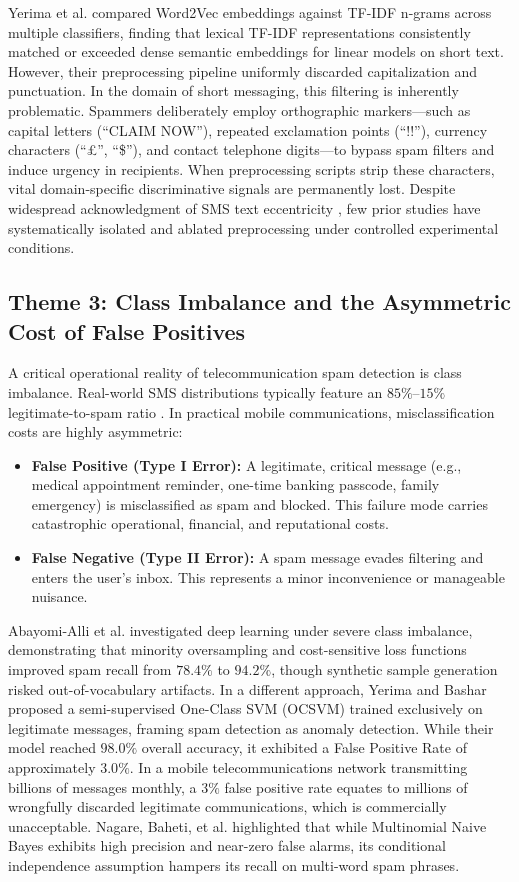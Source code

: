 \documentclass[conference]{IEEEtran}
\begin{document}
Yerima et al. \cite{yerima2022comparative} compared Word2Vec embeddings against TF-IDF n-grams across multiple classifiers, finding that lexical TF-IDF representations consistently matched or exceeded dense semantic embeddings for linear models on short text. However, their preprocessing pipeline uniformly discarded capitalization and punctuation. In the domain of short messaging, this filtering is inherently problematic. Spammers deliberately employ orthographic markers—such as capital letters (``CLAIM NOW''), repeated exclamation points (``!!''), currency characters (``\pounds'', ``\$''), and contact telephone digits—to bypass spam filters and induce urgency in recipients. When preprocessing scripts strip these characters, vital domain-specific discriminative signals are permanently lost. Despite widespread acknowledgment of SMS text eccentricity \cite{alsaidat2024advancements}, few prior studies have systematically isolated and ablated preprocessing under controlled experimental conditions.

\subsection{Theme 3: Class Imbalance and the Asymmetric Cost of False Positives}
A critical operational reality of telecommunication spam detection is class imbalance. Real-world SMS distributions typically feature an $85\%$--$15\%$ legitimate-to-spam ratio \cite{almeida2011contributions, abayomi2022deep}. In practical mobile communications, misclassification costs are highly asymmetric:
\begin{itemize}
    \item \textbf{False Positive (Type I Error):} A legitimate, critical message (e.g., medical appointment reminder, one-time banking passcode, family emergency) is misclassified as spam and blocked. This failure mode carries catastrophic operational, financial, and reputational costs.
    \item \textbf{False Negative (Type II Error):} A spam message evades filtering and enters the user's inbox. This represents a minor inconvenience or manageable nuisance.
\end{itemize}

Abayomi-Alli et al. \cite{abayomi2022deep} investigated deep learning under severe class imbalance, demonstrating that minority oversampling and cost-sensitive loss functions improved spam recall from $78.4\%$ to $94.2\%$, though synthetic sample generation risked out-of-vocabulary artifacts. In a different approach, Yerima and Bashar \cite{yerima2022semi} proposed a semi-supervised One-Class SVM (OCSVM) trained exclusively on legitimate messages, framing spam detection as anomaly detection. While their model reached $98.0\%$ overall accuracy, it exhibited a False Positive Rate of approximately $3.0\%$. In a mobile telecommunications network transmitting billions of messages monthly, a $3\%$ false positive rate equates to millions of wrongfully discarded legitimate communications, which is commercially unacceptable. Nagare, Baheti, et al. \cite{nagare2024short} highlighted that while Multinomial Naive Bayes exhibits high precision and near-zero false alarms, its conditional independence assumption hampers its recall on multi-word spam phrases.
\end{document}
